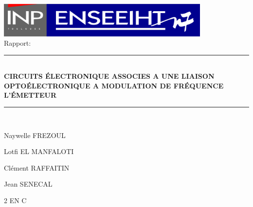 \documentclass[a4paper]{report}
\begin{document}
\\[0.5cm]\center \includegraphics[width=0.8\textwidth]{inpn7logo.pdf}\\[5cm]



{\Large Rapport:}\\[0.5cm]

\rule{\linewidth}{0.5mm} \\[0.4cm]
{ \huge \bfseries CIRCUITS ÉLECTRONIQUE ASSOCIES A UNE LIAISON OPTOÉLECTRONIQUE A MODULATION DE FRÉQUENCE\\[0.4cm] }
{ \large \bfseries L'ÉMETTEUR\\[0.4cm] }
\rule{\linewidth}{0.5mm} \\[1.5cm]


\hspace{6cm}
\noindent
\center
\begin{minipage}{0.4\textwidth}
  \begin{flushleft} \large   
    Naywelle \textsc{FREZOUL} 
  \end{flushleft}
\end{minipage}
\begin{minipage}{0.4\textwidth}
  \begin{flushright} \large
    Lotfi \textsc{EL MANFALOTI} 
  \end{flushright}
\end{minipage}

\vspace{0.5cm}

\begin{minipage}{0.4\textwidth}
  \begin{flushleft} \large   
    Clément \textsc{RAFFAITIN} 
  \end{flushleft}
\end{minipage}
\begin{minipage}{0.4\textwidth}
  \begin{flushright} \large
    Jean \textsc{SENECAL} 
  \end{flushright}
\end{minipage}
\vfill

{\large 2 EN C}

\flushleft        
\newpage
\end{document}
